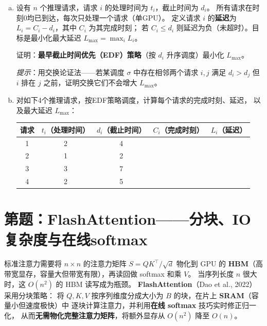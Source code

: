 \documentclass[12pt, a4paper]{ctexart}
\newcounter{problem}
\newcommand{\problem}[1]{%
    \stepcounter{problem}%
    \section*{第\chinese{problem}题：#1}%
}
\begin{document}
\begin{enumerate}[(a)]
    \item 设有 $n$ 个推理请求，请求 $i$ 的处理时间为 $t_i$，截止时间为 $d_i$。
    所有请求在时刻0均已到达，每次只处理一个请求（单GPU）。
    定义请求 $i$ 的\textbf{延迟}为 $L_i = C_i - d_i$，其中 $C_i$ 为其完成时刻；
    若 $C_i \leq d_i$ 则延迟为负（未超时）。目标是最小化最大延迟 $L_{\max} = \max_i L_i$。

    证明：\textbf{最早截止时间优先（EDF）策略}（按 $d_i$ 升序调度）最小化 $L_{\max}$。

    \textit{提示}：用交换论证法——若某调度 $\sigma$ 中存在相邻两个请求 $i, j$ 满足 $d_i > d_j$
    但 $i$ 排在 $j$ 之前，证明交换它们不会增大 $L_{\max}$。

    \item 对如下4个推理请求，按EDF策略调度，计算每个请求的完成时刻、延迟，
    以及最大延迟 $L_{\max}$：

    \begin{center}
    \begin{tabular}{ccccc}
    \toprule
    请求 & $t_i$（处理时间） & $d_i$（截止时间） & $C_i$（完成时刻） & $L_i$（延迟） \\
    \midrule
    1 & 2 & 4 & & \\
    2 & 1 & 2 & & \\
    3 & 3 & 7 & & \\
    4 & 2 & 5 & & \\
    \bottomrule
    \end{tabular}
    \end{center}
\end{enumerate}



\problem{FlashAttention——分块、IO复杂度与在线softmax}

\begin{mlcontext}
标准注意力需要将 $n \times n$ 的注意力矩阵 $S = QK^\top/\sqrt{d}$ 物化到 GPU 的
\textbf{HBM}（高带宽显存，容量大但带宽有限），再读回做 softmax 和乘 $V$。
当序列长度 $n$ 很大时，这 $O(n^2)$ 的 HBM 读写成为瓶颈。
\textbf{FlashAttention}（Dao et al., 2022）采用分块策略：
将 $Q, K, V$ 按序列维度分成大小为 $B$ 的块，在片上 \textbf{SRAM}（容量小但速度极快）中
逐块计算注意力，并利用\textbf{在线 softmax} 技巧实时修正归一化，
从而\textbf{无需物化完整注意力矩阵}，将额外显存从 $O(n^2)$ 降至 $O(n)$。
\end{mlcontext}
\end{document}
